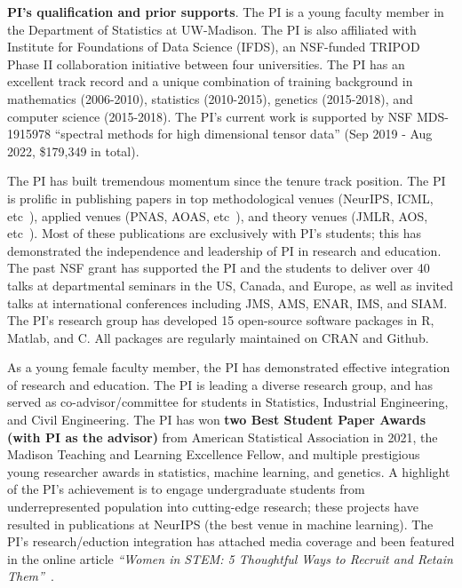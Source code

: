 \documentclass[11pt]{article}
\theoremstyle{exampstyle}
\theoremstyle{definition}
\begin{document}
{\bf PI's qualification and prior supports}. The PI is a young faculty member in the Department of Statistics at UW-Madison. The PI is also affiliated with Institute for Foundations of Data Science (IFDS), an NSF-funded TRIPOD Phase II collaboration initiative between four universities. The PI has an excellent track record and a unique combination of training background in mathematics (2006-2010), statistics (2010-2015), genetics (2015-2018), and computer science (2015-2018). The PI's current work is supported by NSF MDS-1915978 ``spectral methods for high dimensional tensor data'' (Sep 2019 - Aug 2022, \$179,349 in total). 

The PI has built tremendous momentum since the tenure track position. The PI is prolific in publishing papers in top methodological venues (NeurIPS, ICML, etc~\cite{wang2019multiway, wang1, wang3, wang4, pmlr-v119-lee20i}), applied venues (PNAS, AOAS, etc~\cite{wang2019three,wang5,wang9,wang6,wang10}), and theory venues (JMLR, AOS, etc~\cite{wang2018learning, han2020exact,wang7,wang8,wang2}). Most of these publications are exclusively with PI's students; this has demonstrated the independence and leadership of PI in research and education. The past NSF grant has supported the PI and the students to deliver over 40 talks at departmental seminars in the US, Canada, and Europe, as well as invited talks at international conferences including JMS, AMS, ENAR, IMS, and SIAM. The PI's research group has developed 15 open-source software packages in R, Matlab, and C. All packages are regularly maintained on CRAN and Github. 

As a young female faculty member, the PI has demonstrated effective integration of research and education. The PI is leading a diverse research group, and has served as co-advisor/committee for students in Statistics, Industrial Engineering, and Civil Engineering. The PI has won {\bf two Best Student Paper Awards (with PI as the advisor)} from American Statistical Association in 2021, the Madison Teaching and Learning Excellence Fellow, and multiple prestigious young researcher awards in statistics, machine learning, and genetics.  A highlight of the PI's achievement is to engage undergraduate students from underrepresented population into cutting-edge research; these projects have resulted in publications at NeurIPS (the best venue in machine learning). The PI's research/eduction integration has attached media coverage and been featured in the online article \emph{``Women in STEM: 5 Thoughtful Ways to Recruit and Retain Them''}~\cite{wang11}. 
\end{document}
